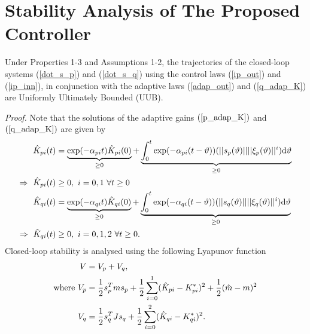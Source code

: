 \section{Stability Analysis of The Proposed Controller}\label{sec:asmc_stab}
\begin{theorem}
Under Properties 1-3 and Assumptions 1-2, the trajectories of the closed-loop systems (\ref{dot_s_p}) and (\ref{dot_s_q}) using the control laws (\ref{ip_out}) and (\ref{ip_inn}), in conjunction with the adaptive laws (\ref{adap_out}) and (\ref{q_adap_K}) are Uniformly Ultimately Bounded (UUB).
\end{theorem}
\textit{Proof.}
	Note that the solutions of the adaptive gains $( \ref{p_adap_K} )$ and $(\ref{q_adap_K})$ are given by \cite{roy2020adaptive}
\begin{align}
\vspace{-0.8cm}
    \hat{K}_{pi}(t) &= \underbrace{\exp(-\alpha_{pi} t) \hat{K}_{pi} (0)}_{\geq 0} + \underbrace{\int_{0}^{t} \exp(-\alpha_{pi}(t-\vartheta)) (|| {s_p} (\vartheta)|| ||\xi_p (\vartheta)||^{i}) \mathrm{d}\vartheta}_{\geq 0} \nonumber \\
    \Rightarrow~\hat{K}_{pi} (t) &\geq 0,~ i=0,1 ~\forall t\geq 0 \label{p_low_bound} \\
    \hat{K}_{qi}(t) &= \underbrace{\exp(-\alpha_{qi} t) \hat{K}_{qi} (0)}_{\geq 0}  + \underbrace{\int_{0}^{t} \exp(-\alpha_{qi}(t-\vartheta)) (|| {s_q} (\vartheta)|| ||\xi_q (\vartheta)||^{i}) \mathrm{d}\vartheta}_{\geq 0} \nonumber\\
    \Rightarrow~\hat{K}_{qi} (t) &\geq 0,~ i=0,1,2 ~\forall t\geq 0. \label{q_low_bound}
\end{align}
Closed-loop stability is analysed using the following Lyapunov function
\begin{align}
 V &= V_p + V_q, \label{overall_lyap}\\
\text{where}~    V_p &= \frac{1}{2}s_p^T m s_p + \frac{1}{2} \sum \limits_{i=0}^{1} (\hat{K}_{pi} - K_{pi}^*)^2 + \frac{1}{2} (\hat{m} - m)^2 \label{p_lyap}\\
    V_q &= \frac{1}{2}s_q^T J s_q + \frac{1}{2} \sum \limits_{i=0}^{2} (\hat{K}_{qi} - K_{qi}^*)^2 .\label{q_lyap}    
\vspace{-0.5cm}
\end{align}

